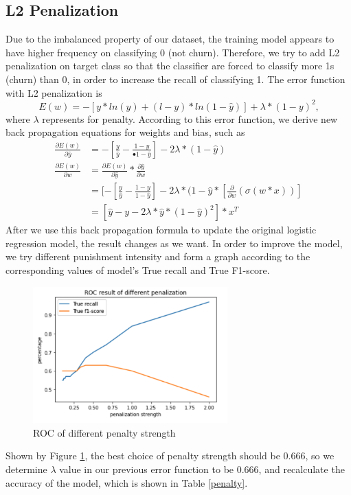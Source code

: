 \documentclass{article}
\begin{document}
\subsection{L2 Penalization}
Due to the imbalanced property of our dataset, the training model appears to have higher frequency on classifying 0 (not churn). Therefore, we try to add L2 penalization on target class so that the classifier are forced to classify more 1s (churn) than 0, in order to increase the recall of classifying 1. The error function with L2 penalization is 
\[E(w)=-[y*ln(\hat{y})+(l-y)*ln(1-\hat{y})]+\lambda*(1-y)^2\texttt{,}\]
where $\lambda$ represents for penalty. According to this error function, we derive new back propagation equations for weights and bias, such as
\begin{align*}
\frac{\partial E(w)}{\partial \hat{y}} &= -[\frac{y}{\hat{y}}-\frac{1-y}{•1-\hat{y}}]-2\lambda*(1-\hat{y})\\
\frac{\partial E(w)}{\partial w} &=  \frac{\partial E(w)}{\partial \hat{y}} * \frac{\partial \hat{y}}{\partial w} \\
											&= [-[\frac{y}{\hat{y}}-\frac{1-y}{1-\hat{y}}]-2\lambda*(1-\hat{y}*[\frac{\partial}{\partial w}(\sigma(w*x))] \\
											&= [\hat{y}-y-2\lambda*\hat{y}*(1-\hat{y})^2]*x^T
\end{align*}
After we use this back propagation formula to update the original logistic regression model, the result changes as we want. In order to improve the model, we try different punishment intensity and form a graph according to the corresponding values of model's True recall and True F1-score. 
\FloatBarrier
\begin{figure}[htb]
    \centering
    \includegraphics[width=7.5cm]{ROC_penalization}
    \caption{ROC of different penalty strength}
    \label{fig:penalty}
\end{figure}
\FloatBarrier
Shown by Figure \ref{fig:penalty}, the best choice of penalty strength should be 0.666, so we determine $\lambda$ value in our previous error function to be 0.666, and recalculate the accuracy of the model, which is shown in Table \ref{penalty}.
\end{document}

